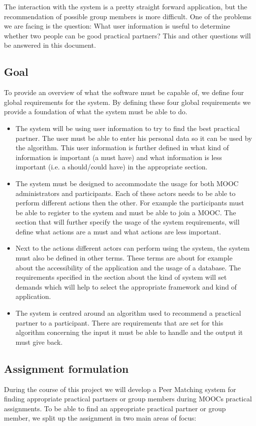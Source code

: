 \documentclass[]{article}
\begin{document}
The interaction with the system is a pretty straight forward application, but the recommendation of possible group members is more difficult.
One of the problems we are facing is the question: What user information is useful to determine whether two people can be good practical partners?
This and other questions will be answered in this document.

\subsection{Goal}
To provide an overview of what the software must be capable of, we define four global requirements for the system.
By defining these four global requirements we provide a foundation of what the system must be able to do.
\begin{itemize}
\item The system will be using user information to try to find the best practical partner.
The user must be able to enter his personal data so it can be used by the algorithm.
This user information is further defined in what kind of information is important (a must have) and what information is less important (i.e. a should/could have) in the appropriate section.
\item The system must be designed to accommodate the usage for both MOOC administrators and participants.
Each of these actors needs to be able to perform different actions then the other.
For example the participants must be able to register to the system and must be able to join a MOOC.
The section that will further specify the usage of the system requirements, will define what actions are a must and what actions are less important.
\item Next to the actions different actors can perform using the system, the system must also be defined in other terms.
These terms are about for example about the accessibility of the application and the usage of a database.
The requirements specified in the section about the kind of system will set demands which will help to select the appropriate framework and kind of application.
\item The system is centred around an algorithm used to recommend a practical partner to a participant.
There are requirements that are set for this algorithm concerning the input it must be able to handle and the output it must give back.
\end{itemize}

\subsection{Assignment formulation}
During the course of this project we will develop a Peer Matching system for finding appropriate practical partners or group members during MOOCs practical assignments.
To be able to find an appropriate practical partner or group member, we split up the assignment in two main areas of focus:
\end{document}
